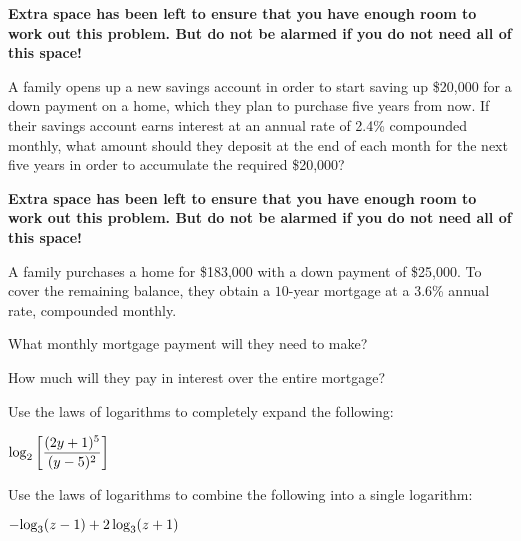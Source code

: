 \documentclass[11pt]{exam}
\begin{document}
\begin{questions}
\textbf{Extra space has been left to ensure that you have enough room to work out this problem.  But do not be alarmed if you do not need all of this space!}
\newpage

\question[3] A family opens up a new savings account in order to start saving up \$20,000 for a down payment on a home, which they plan to purchase five years from now.  If their savings account earns interest at an annual rate of 2.4\% compounded monthly, what amount should they deposit at the end of each month for the next five years in order to accumulate the required \$20,000?

\textbf{Extra space has been left to ensure that you have enough room to work out this problem.  But do not be alarmed if you do not need all of this space!}
\newpage

\question[4] A family purchases a home for \$183,000 with a down payment of \$25,000.  To cover the remaining balance, they obtain a $10$-year mortgage at a 3.6\% annual rate, compounded monthly.
\begin{compactenum}[(a)]
\item What monthly mortgage payment will they need to make?
\vspace{10cm}

\item How much will they pay in interest over the entire mortgage?
\end{compactenum}
\newpage

\question[2] Use the laws of logarithms to completely expand the following:
\begin{center}
$\displaystyle{\log_{2}\left[\frac{(2y+1)^5}{(y-5)^2}\right]}$
\end{center}
\vspace{8cm}

\question[2] Use the laws of logarithms to combine the following into a single logarithm:
\begin{center}
$-\displaystyle{\log_{3}(z - 1) + 2\log_{3}(z + 1)}$
\end{center}
\end{questions}
\end{document}
